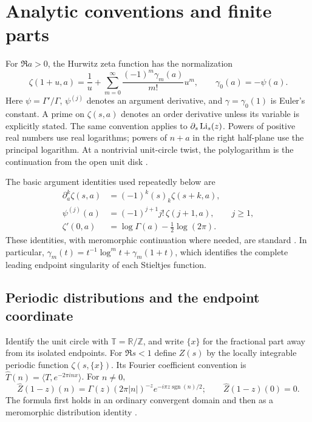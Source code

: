 \section{Analytic conventions and finite parts}
\label{sec:conventions}

For $\Re a>0$, the Hurwitz zeta function has the normalization
\begin{equation}\label{eq:global-stieltjes}
 \zeta(1+u,a)=\frac1u+
   \sum_{m=0}^{\infty}\frac{(-1)^m\gamma_m(a)}{m!}u^m,
 \qquad \gamma_0(a)=-\psi(a).
\end{equation}
Here $\psi=\Gamma'/\Gamma$, $\psi^{(j)}$ denotes an argument derivative,
and $\gamma=\gamma_0(1)$ is Euler's constant.  A prime on $\zeta(s,a)$
denotes an order derivative unless its variable is explicitly stated.
The same convention applies to $\partial_s\operatorname{Li}_s(z)$.
Powers of positive real numbers use real logarithms; powers of $n+a$
in the right half-plane use the principal logarithm.  At a nontrivial
unit-circle twist, the polylogarithm is the continuation from the open
unit disk \cite{dlmf-hurwitz,dlmf-polylog}.

The basic argument identities used repeatedly below are
\begin{align}
 \partial_a^k\zeta(s,a)&=(-1)^k(s)_k\zeta(s+k,a),\label{eq:zeta-arg}\\
 \psi^{(j)}(a)&=(-1)^{j+1}j!\,\zeta(j+1,a),\qquad j\ge1,\label{eq:psi-hurwitz}\\
 \zeta'(0,a)&=\log\Gamma(a)-\tfrac12\log(2\pi).\label{eq:lerch-gamma}
\end{align}
These identities, with meromorphic continuation where needed, are
standard \cite{dlmf-hurwitz}.  In particular,
$\gamma_m(t)=t^{-1}\log^m t+\gamma_m(1+t)$, which identifies the
complete leading endpoint singularity of each Stieltjes function.

\subsection{Periodic distributions and the endpoint coordinate}

Identify the unit circle with $\mathbb T=\mathbb R/\mathbb Z$, and write
$\{x\}$ for the fractional part away from its isolated endpoints.
For $\Re s<1$ define $Z(s)$ by the locally integrable periodic function
$\zeta(s,\{x\})$.  Its Fourier coefficient convention is
$\widehat T(n)=\langle T,e^{-2\pi inx}\rangle$.  For $n\ne0$,
\begin{equation}\label{eq:global-fourier}
 \widehat Z(1-z)(n)=
 \Gamma(z)(2\pi|n|)^{-z}
      e^{-i\pi z\operatorname{sgn}(n)/2};
 \qquad\widehat Z(1-z)(0)=0.
\end{equation}
The formula first holds in an ordinary convergent domain and then as a
meromorphic distribution identity \cite{dlmf-hurwitz}.

